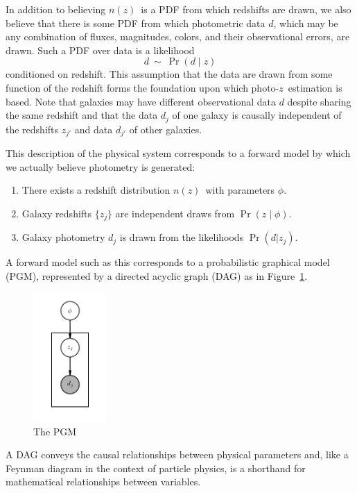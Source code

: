 \documentclass[iop]{emulateapj}
\newcommand{\nz}{$n(z)$}
\newcommand{\pz}{photo-$z$}
\begin{document}
In addition to believing \nz\ is a PDF from which redshifts are drawn, we also 
believe that there is some PDF from which photometric data $d$, which may be 
any combination of fluxes, magnitudes, colors, and their observational errors, 
are drawn.
Such a PDF over data is a likelihood
\begin{equation}
\label{eqn:pzpdf}
d\ \sim\ \Pr(d \mid z)
\end{equation}
conditioned on redshift.
This assumption that the data are drawn from some function of the redshift 
forms the foundation upon which \pz\ estimation is based.
Note that galaxies may have different observational data $d$ despite sharing 
the same redshift and that the data $d_{j}$ of one galaxy is causally 
independent of the redshifts $z_{j'}$ and data $d_{j'}$ of other galaxies.

This description of the physical system corresponds to a forward model by which 
we actually believe photometry is generated:
\begin{enumerate}
	\item There exists a redshift distribution \nz\ with parameters $\phi$.
	\item Galaxy redshifts $\{z_{j}\}$ are independent draws from $\Pr(z 
\mid \phi)$.
	\item Galaxy photometry $d_{j}$ is drawn from the likelihoods $\Pr(d | 
z_{j})$.
\end{enumerate}
A forward model such as this corresponds to a probabilistic graphical model 
(PGM), represented by a directed acyclic graph (DAG) as in Figure~\ref{fig:pgm}.
\begin{figure}
	\begin{center}
		\includegraphics[width=0.25\textwidth]{fig/pgm.png}
		\caption{The PGM}
		\label{fig:pgm}
	\end{center}
\end{figure}
A DAG conveys the causal relationships between physical parameters and, like a 
Feynman diagram in the context of particle physics, is a shorthand for 
mathematical relationships between variables.
\end{document}
